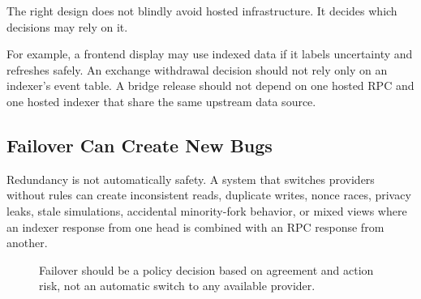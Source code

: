 The right design does not blindly avoid hosted infrastructure. It decides which decisions may rely on it.

For example, a frontend display may use indexed data if it labels uncertainty and refreshes safely. An exchange withdrawal decision should not rely only on an indexer's event table. A bridge release should not depend on one hosted RPC and one hosted indexer that share the same upstream data source.

\subsection{Failover Can Create New Bugs}

Redundancy is not automatically safety. A system that switches providers without rules can create inconsistent reads, duplicate writes, nonce races, privacy leaks, stale simulations, accidental minority-fork behavior, or mixed views where an indexer response from one head is combined with an RPC response from another.

\begin{figure}[htbp]
\centering
{}
\caption{Failover should be a policy decision based on agreement and action risk, not an automatic switch to any available provider.}
\end{figure}

